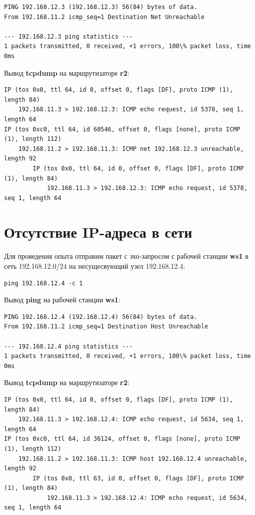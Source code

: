 \documentclass[a4paper,12pt]{article}
\begin{document}
\begin{Verbatim}
PING 192.168.12.3 (192.168.12.3) 56(84) bytes of data.
From 192.168.11.2 icmp_seq=1 Destination Net Unreachable

--- 192.168.12.3 ping statistics ---
1 packets transmitted, 0 received, +1 errors, 100\% packet loss, time 0ms
\end{Verbatim}

Вывод \textbf{tcpdump} на маршрутизаторе \textbf{r2}:

\begin{Verbatim}
IP (tos 0x0, ttl 64, id 0, offset 0, flags [DF], proto ICMP (1), length 84)
    192.168.11.3 > 192.168.12.3: ICMP echo request, id 5378, seq 1, length 64
IP (tos 0xc0, ttl 64, id 60546, offset 0, flags [none], proto ICMP (1), length 112)
    192.168.11.2 > 192.168.11.3: ICMP net 192.168.12.3 unreachable, length 92
	    IP (tos 0x0, ttl 64, id 0, offset 0, flags [DF], proto ICMP (1), length 84)
	        192.168.11.3 > 192.168.12.3: ICMP echo request, id 5378, seq 1, length 64
\end{Verbatim}

\section{Отсутствие IP-адреса в сети}

Для проведения опыта отправим пакет с эхо-запросом с рабочей станции \textbf{ws1} в сеть
192.168.12.0/24 на несущесвующий узел 192.168.12.4:

\begin{Verbatim}
ping 192.168.12.4 -c 1
\end{Verbatim}

Вывод \textbf{ping} на рабочей станции \textbf{ws1}:

\begin{Verbatim}
PING 192.168.12.4 (192.168.12.4) 56(84) bytes of data.
From 192.168.11.2 icmp_seq=1 Destination Host Unreachable

--- 192.168.12.4 ping statistics ---
1 packets transmitted, 0 received, +1 errors, 100\% packet loss, time 0ms
\end{Verbatim}

Вывод \textbf{tcpdump} на маршрутизаторе \textbf{r2}:

\begin{Verbatim}
IP (tos 0x0, ttl 64, id 0, offset 0, flags [DF], proto ICMP (1), length 84)
    192.168.11.3 > 192.168.12.4: ICMP echo request, id 5634, seq 1, length 64
IP (tos 0xc0, ttl 64, id 36124, offset 0, flags [none], proto ICMP (1), length 112)
    192.168.11.2 > 192.168.11.3: ICMP host 192.168.12.4 unreachable, length 92
	    IP (tos 0x0, ttl 63, id 0, offset 0, flags [DF], proto ICMP (1), length 84)
	        192.168.11.3 > 192.168.12.4: ICMP echo request, id 5634, seq 1, length 64
\end{Verbatim}
\end{document}
